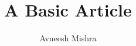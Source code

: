 

\title{A Basic Article}
\author{Avneesh Mishra}


    \maketitle
    \tableofcontents
    \pagebreak

